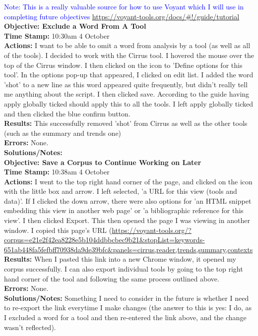 \documentclass{article}
\begin{document}
\begin{FlushLeft}
\vspace{5mm}
\textcolor{blue}{Note: This is a really valuable source for how to use Voyant which I will use in completing future objectives} \url{https://voyant-tools.org/docs/#!/guide/tutorial}\\
\vspace{5mm}
\textbf{Objective: Exclude a Word From A Tool}\\ 
\textbf{Time Stamp:} 10:30am 4 October\\
\textbf{Actions:} I want to be able to omit a word from analysis by a tool (as well as all of the tools). I decided to work with the Cirrus tool. I hovered the mouse over the top of the Cirrus window. I then clicked on the icon to 'Define options for this tool'. In the options pop-up that appeared, I clicked on edit list. I added the word 'shot' to a new line as this word appeared quite frequently, but didn't really tell me anything about the script. I then clicked save. According to the guide having apply globally ticked should apply this to all the tools. I left apply globally ticked and then clicked the blue confirm button.\\
\textbf{Results:} This successfully removed 'shot' from Cirrus as well as the other tools (such as the summary and trends one)\\
\textbf{Errors:} None.\\
\textbf{Solutions/Notes:}\\
\vspace{5mm}
\textbf{Objective: Save a Corpus to Continue Working on Later}\\ 
\textbf{Time Stamp:} 10:38am 4 October\\
\textbf{Actions:} I went to the top right hand corner of the page, and clicked on the icon with the little box and arrow. I left selected, 'a URL for this view (tools and data)'. If I clicked the down arrow, there were also options for 'an HTML snippet embedding this view in another web page' or 'a bibliographic reference for this view'. I then clicked Export. This then opened the page I was viewing in another window. I copied this page's URL (\url{https://voyant-tools.org/?corpus=e21e2f42ea8228e5b104ddbbcbec9b21&stopList=keywords-651ab448fa5fefbff70938da9de39bfc&panels=cirrus,reader,trends,summary,contexts}\\
\textbf{Results:} When I pasted this link into a new Chrome window, it opened my corpus successfully. I can also export individual tools by going to the top right hand corner of the tool and following the same process outlined above.\\
\textbf{Errors:} None.\\
\textbf{Solutions/Notes:} Something I need to consider in the future is whether I need to re-export the link everytime I make changes (the answer to this is yes: I do, as I excluded a word for a tool and then re-entered the link above, and the change wasn't reflected).\\


\end{FlushLeft}
\end{document}

